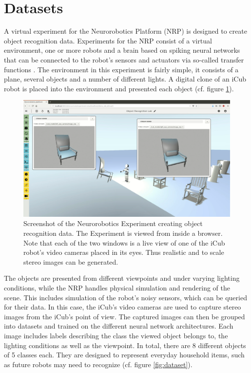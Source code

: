 \section{Datasets}
A virtual experiment for the Neurorobotics Platform (NRP) is designed to create object recognition data. Experiments for the NRP consist of a virtual environment, one or more robots and a brain based on spiking neural networks that can be connected to the robot's sensors and actuators via so-called transfer functions \cite{knoll2016neurorobotics}. The environment in this experiment is fairly simple, it consists of a plane, several objects and a number of different lights. A digital clone of an iCub robot \cite{vannucci2015visual} is placed into the environment and presented each object (cf. figure \ref{fig:nrp}).
\begin{figure}[H]
    \centering
    \includegraphics[width=\textwidth]{figures/nrp.png}
\caption[Screenshot of the Neurorobotics Experiment creating object recognition data.]{Screenshot of the Neurorobotics Experiment creating object recognition data. The Experiment is viewed from inside a browser. Note that each of the two windows is a live view of one of the iCub robot's video cameras placed in its eyes. Thus realistic and to scale stereo images can be generated.}\label{fig:nrp}
\end{figure}\newpage\noindent
The objects are presented from different viewpoints and under varying lighting conditions, while the NRP handles physical simulation and rendering of the scene. This includes simulation of the robot's noisy sensors, which can be queried for their data. In this case, the iCub's video cameras are used to capture stereo images from the iCub's point of view. The captured images can then be grouped into datasets and trained on the different neural network architectures. Each image includes labels describing the class the viewed object belongs to, the lighting conditions as well as the viewpoint. In total, there are 8 different objects of 5 classes each. They are designed to represent everyday household items, such as future robots may need to recognize (cf. figure \ref{fig:dataset}).
